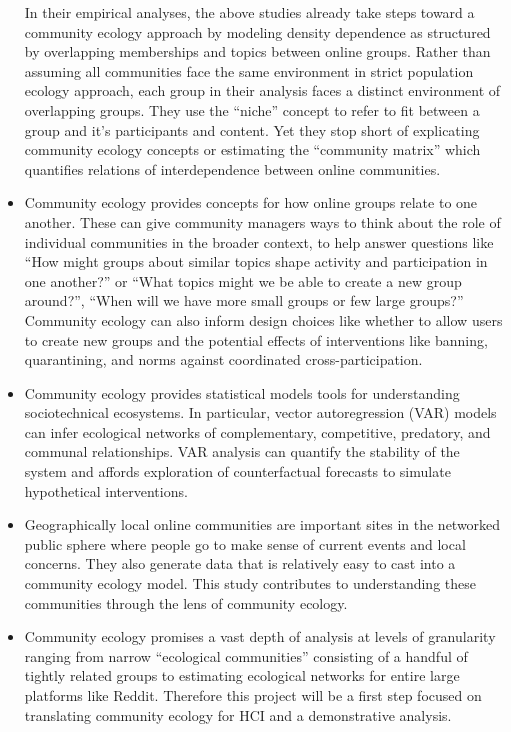 \documentclass[12pt]{memoir}
\begin{document}
\begin{itemize}
In their empirical analyses, the above studies already take steps toward a community ecology approach by modeling density dependence as structured by overlapping memberships and topics between online groups.  Rather than assuming all communities face the same environment in strict population ecology approach, each group in their analysis faces a distinct environment of overlapping groups. They use the ``niche'' concept to refer to fit between a group and it's participants and content. Yet they stop short of explicating community ecology concepts or estimating the ``community matrix'' which quantifies relations of interdependence between online communities. 

\item Community ecology provides concepts for how online groups relate to one another.  These can give community managers ways to think about the role of individual communities in the broader context, to help answer questions like ``How might groups about similar topics shape activity and participation in one another?'' or ``What topics might we be able to create a new group around?'', ``When will we have more small groups or few large groups?'' Community ecology can also inform design choices like whether to allow users to create new groups and the potential effects of interventions like banning, quarantining, and norms against coordinated cross-participation.

\item Community ecology provides statistical models tools for understanding sociotechnical ecosystems.  In particular, vector autoregression (VAR) models can infer ecological networks of complementary, competitive, predatory, and communal relationships.  VAR analysis can quantify the stability of the system and affords exploration of counterfactual forecasts to simulate hypothetical interventions. 

\item Geographically local online communities are important sites in the networked public sphere where people go to make sense of current events and local concerns.  They also generate data that is relatively easy to cast into a community ecology model.  This study contributes to understanding these communities through the lens of community ecology.

\item Community ecology promises a vast depth of analysis at levels of granularity ranging from narrow ``ecological communities'' consisting of a handful of tightly related groups to estimating ecological networks for entire large platforms like Reddit.  Therefore this project will be a first step focused on translating community ecology for HCI and a demonstrative analysis.

\end{itemize}
\end{document}

